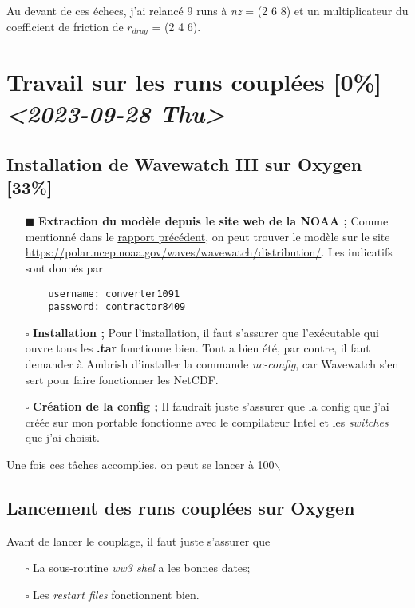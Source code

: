 \documentclass[10pt]{report}
\numberwithin{equation}{section}
\renewcommand{\boxtimes}{\blacksquare}
\begin{document}
Au devant de ces échecs, j'ai relancé 9 runs à \emph{nz} = (2 6 8) et un multiplicateur du coefficient de friction de \(r_{drag}\) = (2 4 6).

\section{Travail sur les runs couplées [0\%] -- \textit{<2023-09-28 Thu>}}
\label{sec:org66b4707}

\subsection{Installation de Wavewatch III sur Oxygen [33\%]}
\label{sec:orgb1b5009}
\begin{itemize}
\item[{$\boxtimes$}] \textbf{Extraction du modèle depuis le site web de la NOAA ;}
Comme mentionné dans le \href{rapport-2023-09-22.pdf}{rapport précédent}, on peut trouver le modèle sur le site \url{https://polar.ncep.noaa.gov/waves/wavewatch/distribution/}.
Les indicatifs sont donnés par
\begin{verbatim}
    username: converter1091
    password: contractor8409
\end{verbatim}
\item[{$\square$}] \textbf{Installation ;}
Pour l'installation, il faut s'assurer que l'exécutable qui ouvre tous les \textbf{.tar} fonctionne bien.
Tout a bien été, par contre, il faut demander à Ambrish d'installer la commande \emph{nc-config}, car Wavewatch s'en sert pour faire fonctionner les NetCDF.
\item[{$\square$}] \textbf{Création de la config ;}
Il faudrait juste s'assurer que la config que j'ai créée sur mon portable fonctionne avec le compilateur Intel et les \emph{switches} que j'ai choisit.
\end{itemize}

Une fois ces tâches accomplies, on peut se lancer à 100$\backslash$%

\subsection{Lancement des runs couplées sur Oxygen}
\label{sec:orgf675202}
Avant de lancer le couplage, il faut juste s'assurer que
\begin{itemize}
\item[{$\square$}] La sous-routine \emph{ww3 shel} a les bonnes dates;
\item[{$\square$}] Les \emph{restart files} fonctionnent bien.
\end{itemize}
\end{document}
